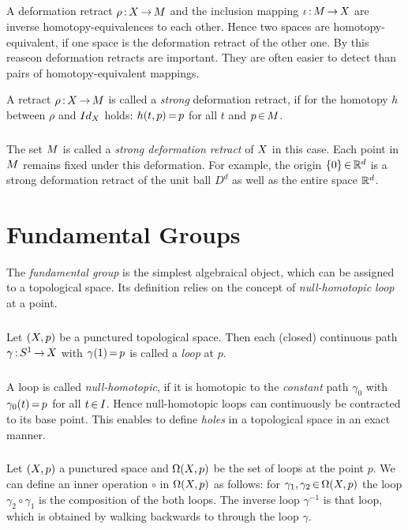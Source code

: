 \documentclass[11pt,twoside]{article}
\begin{document}
\subparagraph{}
A deformation retract $\rho {\,:\,} X {\,\to\,} M$ and the inclusion mapping
$\iota {\,:\,} M {\,\to\,} X$ are inverse homotopy-equivalences to each other.
Hence two spaces are homotopy-equivalent,
if one space is the deformation retract of the other one.
By this reaseon deformation retracts are important.
They are often easier to detect than pairs of homotopy-equivalent mappings.

\begin{definition} %
A retract $\rho {\,:\,} X {\,\to\,} M$ is called a \textit{strong}
deformation retract,
if for the homotopy $h$ between $\rho$ and $Id_{X}$ holds:
$h(t,p) {\,=\,} p$ for all $t$ and $p {\,\in\,} M$.
\end{definition}

\subparagraph{}
The set $M$ is called a
\textit{strong deformation retract} of $X$ in this case.
Each point in $M$ remains fixed under this deformation.
For example,
the origin $\{0\} {\,\in\,} {\mathbb{R}}^d$ is a strong deformation retract
of the unit ball $D^d$ as well as the entire space ${\mathbb{R}}^d$.

\section{Fundamental Groups}
The \textit{fundamental group} is the simplest algebraical object,
which can be assigned to a topological space.
Its definition relies on the concept of \textit{null-homotopic loop} at a point.

\subparagraph{}
Let $(X,p)$ be a punctured topological space.
Then each (closed) continuous path $\gamma {\,:\,} S^1 {\,\to\,} X$
with $\gamma(1) {\,=\,} p$ is called a \textit{loop} at $p$.

\subparagraph{}
A loop is called \textit{null-homotopic},
if it is homotopic to the \textit{constant} path $\gamma_0$
with $\gamma_0(t) {\,=\,} p$ for all $t {\,\in\,} I$.
Hence null-homotopic loops can continuously be contracted to its base point.
This enables to define \textit{holes} in a topological space in an exact manner.

\subparagraph{}
Let $(X,p)$ a punctured space and $\Omega(X,p)$
be the set of loops at the point $p$.
We can define an inner operation $\circ$ in $\Omega(X,p)$ as follows:
for $\gamma_1, \gamma_2 {\,\in\,} \Omega(X,p)$ the loop $\gamma_2 \circ \gamma_1$
is the composition of the both loops.
The inverse loop $\gamma^{-1}$ is that loop,
which is obtained by walking backwards to through the loop $\gamma$.
\end{document}
